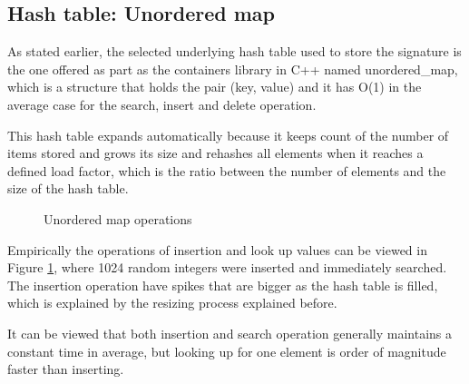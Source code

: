 \documentclass[a4paper,12pt]{article}
\begin{document}
\subsection{Hash table: Unordered map} \label{hashTable}
As stated earlier, the selected underlying hash table used to store the signature is the one offered as part as the containers library in C++ named unordered\_map, which is a structure that holds the pair (key, value) and it has O(1) in the average case for the search, insert and delete operation.

This hash table expands automatically because it keeps count of the number of items stored and grows its size and rehashes all elements when it reaches a defined load factor, which is the ratio between the number of elements and the size of the hash table. 

\begin{figure}[H]
\centering
{}%
\hfill %
%
\caption{Unordered map operations}
\label{fig:hashTableFig}
\end{figure}

Empirically the operations of insertion and look up values can be viewed in Figure \ref{fig:hashTableFig}, where 1024 random integers were inserted and immediately searched. The insertion operation have spikes that are bigger as the hash table is filled, which is explained by the resizing process explained before. 

It can be viewed that both insertion and search operation generally maintains a constant time in average, but looking up for one element is order of magnitude faster than inserting. \\
\end{document}
